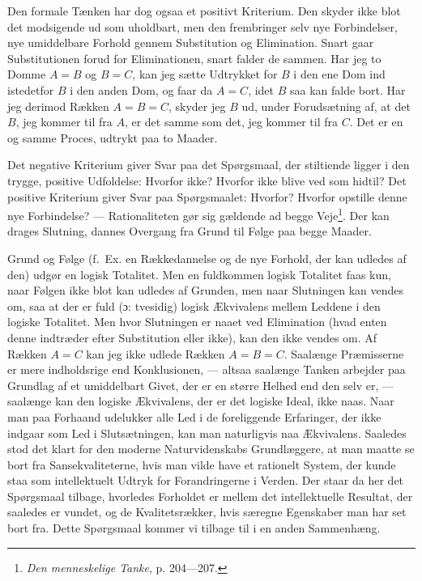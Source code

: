 \documentclass[12pt]{article}
\newcommand{\opage}[1]{\marginnote{\footnotesize\textit{[#1]}}}
\begin{document}
Den formale Tænken har dog ogsaa et positivt Kriterium. Den skyder ikke blot
det modsigende ud som uholdbart, men den frembringer selv nye Forbindelser,
nye umiddelbare Forhold gennem Substitution og Elimination. Snart gaar
Substitutionen forud for Eliminationen, snart falder de sammen. Har jeg to
Domme $A = B$
\setcounter{footnote}{0}%
\opage{39}og $B = C$, kan jeg sætte Udtrykket for $B$ i den ene Dom ind
istedetfor $B$ i den anden Dom, og faar da $A = C$, idet $B$ saa kan falde
bort. Har jeg derimod Rækken $A = B = C$, skyder jeg $B$ ud, under
Forudsætning af, at det $B$, jeg kommer til fra $A$, er det samme som det, jeg
kommer til fra $C$. Det er en og samme Proces, udtrykt paa to Maader.

Det negative Kriterium giver Svar paa det Spørgsmaal, der stiltiende ligger i
den trygge, positive Udfoldelse: Hvorfor ikke? Hvorfor ikke blive ved som
hidtil? Det positive Kriterium giver Svar paa Spørgsmaalet: Hvorfor? Hvorfor
opstille denne nye Forbindelse? --- Rationaliteten gør sig gældende ad begge
Veje\footnote{\textit{Den menneskelige Tanke}, p. 204---207.}. Der kan drages
Slutning, dannes Overgang fra Grund til Følge paa begge Maader.

Grund og Følge (f.~Ex. en Rækkedannelse og de nye Forhold, der kan udledes af
den) udgør en logisk Totalitet. Men en fuldkommen logisk Totalitet faas kun,
naar Følgen ikke blot kan udledes af Grunden, men naar Slutningen kan vendes
om, saa at der er fuld
(ɔ: tvesidig) logisk Ækvivalens mellem Leddene i den logiske Totalitet. Men
hvor Slutningen er naaet ved Elimination (hvad enten denne indtræder efter
Substitution eller ikke), kan den ikke vendes om. Af Rækken $A = C$ kan jeg
ikke udlede Rækken $A = B = C$. Saalænge Præmisserne er mere indholdsrige end
Konklusionen, --- altsaa saalænge Tanken arbejder paa Grundlag af et
umiddelbart Givet, der er en større Helhed end den selv er, --- saalænge kan
den logiske Ækvivalens, der er det logiske Ideal, ikke naas. Naar man paa
Forhaand udelukker alle Led i de foreliggende Erfaringer, der ikke indgaar som
Led i Slutsætningen, kan man naturligvis naa Ækvivalens. Saaledes stod det
klart for den moderne Naturvidenskabs Grundlæggere, at man maatte se bort fra
Sansekvaliteterne, hvis man vilde have et rationelt System, der kunde staa som
intellektuelt Udtryk for Forandringerne i Verden. Der staar da her det
Spørgsmaal tilbage, hvorledes Forholdet er mellem det intellektuelle Resultat,
der saaledes er vundet, og de Kvalitetsrækker, hvis særegne Egenskaber man har
set bort fra. Dette Spørgsmaal kommer vi tilbage til i en anden Sammenhæng.
\end{document}
